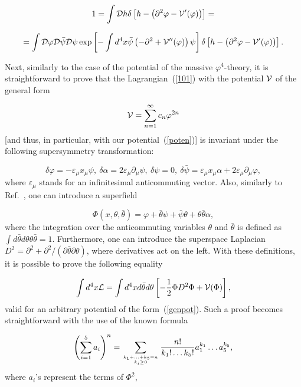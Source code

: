 \documentclass[a4paper,12pt]{article}
\begin{document}
$$1=\int {\cal D}h\delta\left[h-\left(\partial^2\varphi-{\cal V}'(\varphi)\right)\right]=$$

$$=\int {\cal D}\varphi{\cal D}\bar\psi{\cal D}\psi
\exp\left[-\int d^4x\bar\psi\left(-\partial^2+{\cal V}''(\varphi)\right)\psi\right]
\delta\left[h-\left(\partial^2\varphi-{\cal V}'(\varphi)\right)\right].$$
  
Next, similarly to the case of the potential of the massive $\varphi^4$-theory, it is straightforward
to prove that the Lagrangian~(\ref{101}) with the potential ${\cal V}$ of the general form 

\begin{equation}
\label{genpot}
{\cal V}=\sum\limits_{n=1}^{\infty}
c_n\varphi^{2n}
\end{equation} 
[and thus, in particular, with our potential~(\ref{poten})]
is invariant under the following supersymmetry transformation: 

\begin{equation}
\label{trans}
\delta\varphi=-\varepsilon_\mu x_\mu\psi,~ 
\delta\alpha=2\varepsilon_\mu\partial_\mu\psi,~
\delta\psi=0,~
\delta\bar\psi=\varepsilon_\mu x_\mu\alpha+2\varepsilon_\mu\partial_\mu\varphi,
\end{equation}
where $\varepsilon_\mu$ stands for an infinitesimal anticommuting vector. Also, similarly to Ref.~\cite{ps}, 
one can introduce a superfield 

$$\Phi\left(x,\theta,\bar\theta\right)=\varphi+\bar\theta\psi+\bar\psi\theta+\theta\bar\theta\alpha,$$
where the integration over the anticommuting variables $\theta$ and $\bar\theta$ is defined as 
$\int d\bar\theta d\theta\theta\bar\theta=1$. Furthermore, one can introduce the superspace Laplacian 
$D^2=\partial^2+\partial^2/(\partial\bar\theta\partial\theta)$, where derivatives act on the left.
With these definitions, it is possible to prove the following equality

\begin{equation}
\label{susy}
\int d^4x{\cal L}=\int d^4xd\bar\theta d\theta\left[-\frac12\Phi D^2\Phi+{\cal V}(\Phi)\right],
\end{equation}
valid for an arbitrary potential of the form~(\ref{genpot}). Such a proof becomes 
straightforward with the use of the known formula

$$\left(\sum\limits_{i=1}^{5}a_i\right)^n=\sum\limits_{{k_1+\ldots+k_5=n}\atop {k_i\ge 0}}^{}
\frac{n!}{k_1!\ldots k_5!}a_1^{k_1}\ldots a_5^{k_5},$$
where $a_i$'s represent the terms of $\Phi^2$, 
\end{document}
